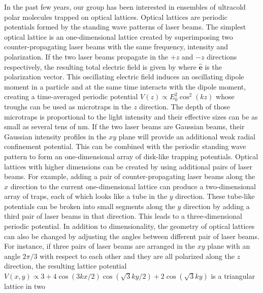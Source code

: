 In the past few years, our group has been interested in ensembles of ultracold polar molecules trapped on optical lattices.  Optical lattices are
 periodic potentials formed by the standing wave patterns of  laser 
 beams\cite{Jessen1996, phillips1998}. 
The simplest optical lattice is an one-dimensional lattice created by  superimposing two counter-propagating laser 
beams 
with the same frequency, intensity and polarization.  If the two laser beams propagate in the $+z$ and $-z$ directions respectively, the 
resulting total electric field is given by
where $\mathbf{\hat{e}}$ is the polarization vector. This oscillating electric field induces an oscillating dipole moment in a
particle and at the same time interacts with the dipole moment, creating a time-averaged periodic potential $V(z) \propto E_0^2  \cos^2 (k z)$ whose troughs can be used as microtraps in the $z$ direction.  The depth of those microtraps is 
proportional to the light intensity and their effective sizes can be as small as several tens of nm. If the two laser 
beams are Gaussian beams, their Gaussian intensity profiles in the $xy$ plane will provide an additional weak radial 
confinement potential. This can be combined with the periodic standing wave pattern to form an one-dimensional array of  disk-like 
trapping potentials. Optical lattices with higher dimensions can be created by using additional pairs of laser beams. For example,
adding a pair of counter-propagating laser beams along the $x$ direction to the current one-dimensional lattice can 
produce a two-dimensional array of traps, each of which looks like a tube in the $y$ direction. These tube-like potentials 
can be broken into small segments along the $y$ direction by adding a third pair of  laser beams in that direction.
This leads to a three-dimensional periodic potential. 
In addition to dimensionality, the geometry of optical lattices can also be changed by adjusting the angles between different pair of laser beams. For instance, if three pairs of laser beams are arranged in the $xy$ 
plane with an angle $2\pi/3$ with respect to each other and they are all polarized along the $z$ direction, the resulting
lattice potential $V(x, y) \propto 3 + 4\cos(3 k x/2)\cos(\sqrt{3}ky/2) + 2\cos(\sqrt{3}ky)$ is a triangular lattice in two
